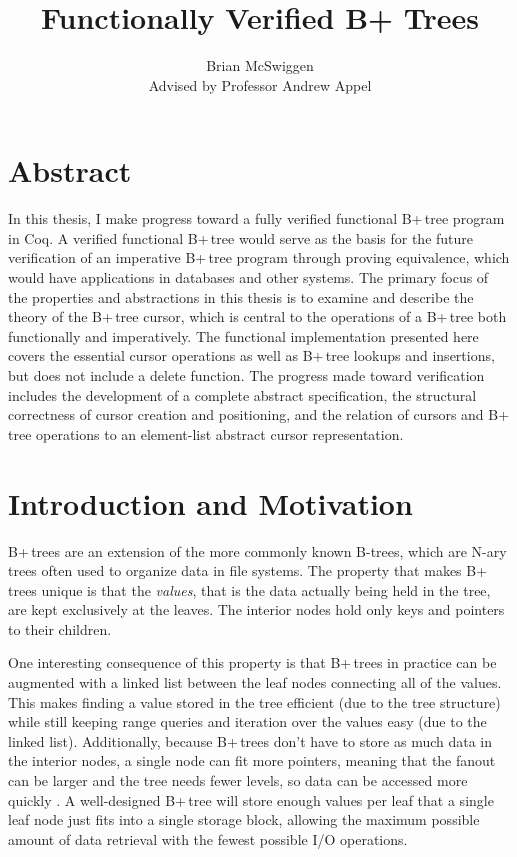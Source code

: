 \documentclass[a4paper,12pt]{article}
\title{Functionally Verified B+ Trees}
\author{Brian McSwiggen\\
        Advised by Professor Andrew Appel}
\begin{document}
\maketitle

\clearpage

\doublespacing

\section{Abstract}

In this thesis, I make progress toward a fully verified functional B+\,tree program in Coq. A verified functional B+\,tree would serve as the basis for the future verification of an imperative B+\,tree program through proving equivalence, which would have applications in databases and other systems. The primary focus of the properties and abstractions in this thesis is to examine and describe the theory of the B+\,tree cursor, which is central to the operations of a B+\,tree both functionally and imperatively. The functional implementation presented here covers the essential cursor operations as well as B+\,tree lookups and insertions, but does not include a delete function. The progress made toward verification includes the development of a complete abstract specification, the structural correctness of cursor creation and positioning, and the relation of cursors and B+\,tree operations to an element-list abstract cursor representation.

\clearpage

\section{Introduction and Motivation}

B+\,trees are an extension of the more commonly known B-trees, which are N-ary trees often used to organize data in file systems. The property that makes B+\,trees unique is that the \textit{values}, that is the data actually being held in the tree, are kept exclusively at the leaves. The interior nodes hold only keys and pointers to their children.

One interesting consequence of this property is that B+\,trees in practice can be augmented with a linked list between the leaf nodes connecting all of the values. This makes finding a value stored in the tree efficient (due to the tree structure) while still keeping range queries and iteration over the values easy (due to the linked list). Additionally, because B+\,trees don’t have to store as much data in the interior nodes, a single node can fit more pointers, meaning that the fanout can be larger and the tree needs fewer levels, so data can be accessed more quickly \cite{elmasri_navathe_2011}. A well-designed B+\,tree will store enough values per leaf that a single leaf node just fits into a single storage block, allowing the maximum possible amount of data retrieval with the fewest possible I/O operations.
\end{document}
